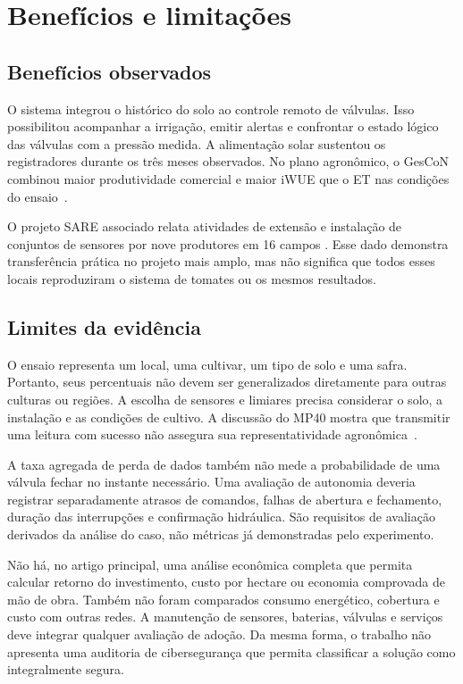 \documentclass[11pt,a4paper]{article}
\begin{document}
\section{Benefícios e limitações}
\subsection{Benefícios observados}
O sistema integrou o histórico do solo ao controle remoto de válvulas. Isso possibilitou acompanhar a irrigação, emitir alertas e confrontar o estado lógico das válvulas com a pressão medida. A alimentação solar sustentou os registradores durante os três meses observados. No plano agronômico, o GesCoN combinou maior produtividade comercial e maior iWUE que o ET nas condições do ensaio~\cite{zhang2022}.

O projeto SARE associado relata atividades de extensão e instalação de conjuntos de sensores por nove produtores em 16 campos \cite{sare}. Esse dado demonstra transferência prática no projeto mais amplo, mas não significa que todos esses locais reproduziram o sistema de tomates ou os mesmos resultados.

\subsection{Limites da evidência}
O ensaio representa um local, uma cultivar, um tipo de solo e uma safra. Portanto, seus percentuais não devem ser generalizados diretamente para outras culturas ou regiões. A escolha de sensores e limiares precisa considerar o solo, a instalação e as condições de cultivo. A discussão do MP40 mostra que transmitir uma leitura com sucesso não assegura sua representatividade agronômica~\cite{zhang2022}.

A taxa agregada de perda de dados também não mede a probabilidade de uma válvula fechar no instante necessário. Uma avaliação de autonomia deveria registrar separadamente atrasos de comandos, falhas de abertura e fechamento, duração das interrupções e confirmação hidráulica. São requisitos de avaliação derivados da análise do caso, não métricas já demonstradas pelo experimento.

Não há, no artigo principal, uma análise econômica completa que permita calcular retorno do investimento, custo por hectare ou economia comprovada de mão de obra. Também não foram comparados consumo energético, cobertura e custo com outras redes. A manutenção de sensores, baterias, válvulas e serviços deve integrar qualquer avaliação de adoção. Da mesma forma, o trabalho não apresenta uma auditoria de cibersegurança que permita classificar a solução como integralmente segura.
\end{document}
